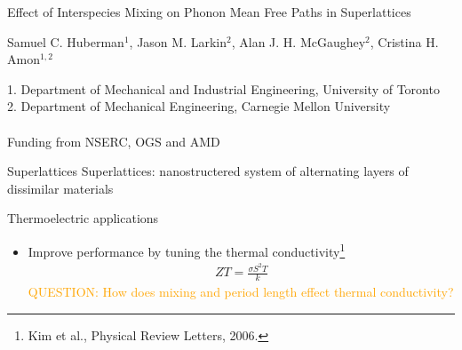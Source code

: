 \documentclass{beamer}
\begin{document}
\begin{frame}
\Large{Effect of Interspecies Mixing on Phonon Mean Free Paths in Superlattices}

\small{Samuel C. Huberman$^1$, Jason M. Larkin$^2$, Alan J. H. McGaughey$^2$, Cristina H. Amon$^{1,2}$}\\

\date{
	\\
	\vspace{1cm}
	\today
}
\vspace{1cm}
\small{1. Department of Mechanical and Industrial Engineering, University of Toronto}\\
\small{2. Department of Mechanical Engineering, Carnegie Mellon University}\\
\\
Funding from NSERC, OGS and AMD
\end{frame}

\begin{frame}{Superlattices}
Superlattices: nanostructered system of alternating layers of dissimilar materials
\begin{figure}[t]
\begin{center}
\renewcommand{\figure}{Fig.}
\end{center}
\end{figure}
\vspace*{-0.8cm}
Thermoelectric applications
\begin{itemize}
\item Improve performance by tuning the thermal conductivity\footnote{Kim et al., Physical Review Letters, 2006.}
\begin{equation*}\label{EQ:NMD:qdot}
\begin{split}
ZT=\frac{\sigma S^2 T}{k}
\end{split}
\end{equation*}
\textcolor{orange}{QUESTION: How does mixing and period length effect thermal conductivity?}\\
\end{itemize}
\end{frame}
\end{document}
